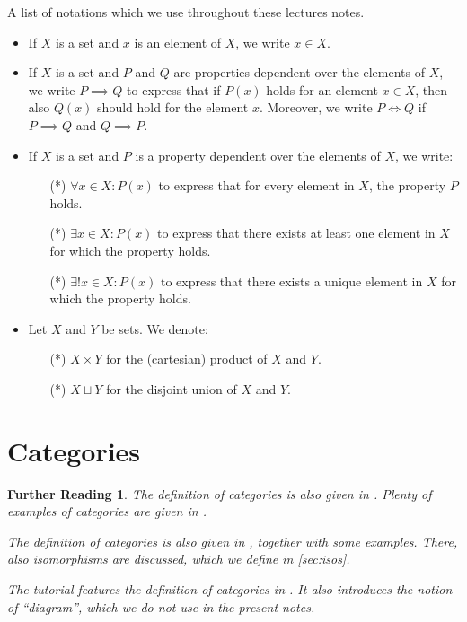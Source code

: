 \documentclass[a4paper,10pt]{scrartcl}
\theoremstyle{plain}
\newtheorem*{reading*}{Further Reading}
\theoremstyle{definition}
\begin{document}
A list of notations which we use throughout these lectures notes.
\begin{itemize}
\item If $X$ is a set and $x$ is an element of $X$, we write $x \in X$.
\item If $X$ is a set and $P$ and $Q$ are properties dependent over the elements of $X$, we write $P\implies Q$ to express that if $P(x)$ holds for an element $x\in X$, then also $Q(x)$ should hold for the element $x$. Moreover, we write $P \iff Q$ if $P\implies Q$ and $Q\implies P$.
\item If $X$ is a set and $P$ is a property dependent over the elements of $X$, we write:
\begin{itemize}
\item[(*)] $\forall x\in X: P(x)$ to express that for every element in $X$, the property $P$ holds.
\item[(*)] $\exists x\in X: P(x)$ to express that there exists at least one element in $X$ for which the property holds.
\item[(*)] $\exists! x\in X: P(x)$ to express that there exists a unique element in $X$ for which the property holds.
\end{itemize}
\item Let $X$ and $Y$ be sets. We denote:
\begin{itemize}
\item[(*)] $X\times Y$ for the (cartesian) product of $X$ and $Y$.
\item[(*)] $X\sqcup Y$ for the disjoint union of $X$ and $Y$.
\end{itemize}
\end{itemize}



\section{Categories}
\label{sec:categories}

\begin{reading*}
The definition of categories is also given in \cite[\S 2.1]{barr-wells}. Plenty of examples of categories are given in \cite[\S\S 2.3--2.5]{barr-wells}.

  The definition of categories is also given in \cite[\S 1.1]{leinster}, together with some examples.
  There, also isomorphisms are discussed, which we define in \cref{sec:isos}.

  The tutorial \cite{pierce} features the definition of categories in \cite[\S 2.1]{pierce}.
  It also introduces the notion of ``diagram'', which we do not use in the present notes.
\end{reading*}
\end{document}
